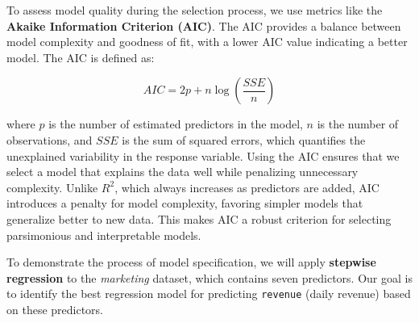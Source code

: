 \documentclass[
]{book}
\newcommand{\passthrough}[1]{#1}
\theoremstyle{definition}
\theoremstyle{definition}
\theoremstyle{definition}
\theoremstyle{definition}
\theoremstyle{remark}
\begin{document}
To assess model quality during the selection process, we use metrics like the \textbf{Akaike Information Criterion (AIC)}. The AIC provides a balance between model complexity and goodness of fit, with a lower AIC value indicating a better model. The AIC is defined as:

\[
AIC = 2p + n \log\left(\frac{SSE}{n}\right)
\]

where \(p\) is the number of estimated predictors in the model, \(n\) is the number of observations, and \(SSE\) is the sum of squared errors, which quantifies the unexplained variability in the response variable. Using the AIC ensures that we select a model that explains the data well while penalizing unnecessary complexity. Unlike \(R^2\), which always increases as predictors are added, AIC introduces a penalty for model complexity, favoring simpler models that generalize better to new data. This makes AIC a robust criterion for selecting parsimonious and interpretable models.

To demonstrate the process of model specification, we will apply \textbf{stepwise regression} to the \emph{marketing} dataset, which contains seven predictors. Our goal is to identify the best regression model for predicting \passthrough{\lstinline!revenue!} (daily revenue) based on these predictors.
\end{document}
